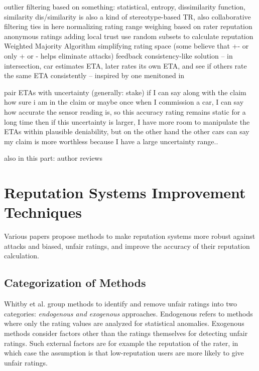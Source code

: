 \documentclass[%
    ]{\PathToTumTemplate/thesis/tum_thesis}
\begin{document}
outlier filtering based on something: statistical, entropy, dissimilarity function, similarity
dis/similarity is also a kind of stereotype-based TR, also collaborative filtering ties in here
normalizing rating range
weighing based on rater reputation
anonymous ratings
adding local trust
use random subsets to calculate reputation
Weighted Majority Algorithm 
simplifying rating space (some believe that +- or only + or - helps eliminate attacks)
feedback consistency-like solution -- in intersection, car estimates ETA, later rates its own ETA, and see if others rate the same ETA consistently -- inspired by one menitoned in \cite{azzedin_identifying_2010}

pair ETAs with uncertainty (generally: stake)
if I can say along with the claim how sure i am in the claim
or maybe once when I commission a car, I can say how accurate the sensor reading is, so this accuracy rating remains static for a long time
then if this uncertainty is larger, I have more room to manipulate the ETAs within plausible deniability, but on the other hand the other cars can say my claim is more worthless because I have a large uncertainty range..

also in this part: author reviews
\fi


\section{Reputation Systems Improvement Techniques}\label{sec:related_improvements}

Various papers propose methods to make reputation systems more robust against attacks and biased, unfair ratings, and improve the accuracy of their reputation calculation.


\subsection{Categorization of Methods}

Whitby et al. group methods to identify and remove unfair ratings into two categories: \emph{endogenous and exogenous} approaches\cite{whitby_filtering_2014}.
Endogenous refers to methods where only the rating values are analyzed for statistical anomalies.
Exogenous methods consider factors other than the ratings themselves for detecting unfair ratings.
Such external factors are for example the reputation of the rater, in which case the assumption is that low-reputation users are more likely to give unfair ratings.
\end{document}
